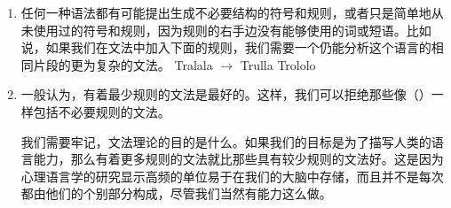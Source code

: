 \begin{enumerate}
\item 任何一种语法都有可能提出生成不必要结构的符号和规则，或者只是简单地从未使用过的符号和规则，因为规则的右手边没有能够使用的词或短语。比如说，如果我们在文法中加入下面的规则，我们需要一个仍能分析这个语言的相同片段的更为复杂的文法。
\ea
Tralala $\to$ Trulla Trololo
\z
\item 一般认为，有着最少规则的文法是最好的。这样，我们可以拒绝那些像（）一样包括不必要规则的文法。

我们需要牢记，文法理论的目的是什么。如果我们的目标是为了描写人类的语言能力，那么有着更多规则的文法就比那些具有较少规则的文法好。这是因为心理语言学的研究显示高频的单位易于在我们的大脑中存储，而且并不是每次都由他们的个别部分构成，尽管我们当然有能力这么做。



\end{enumerate}
